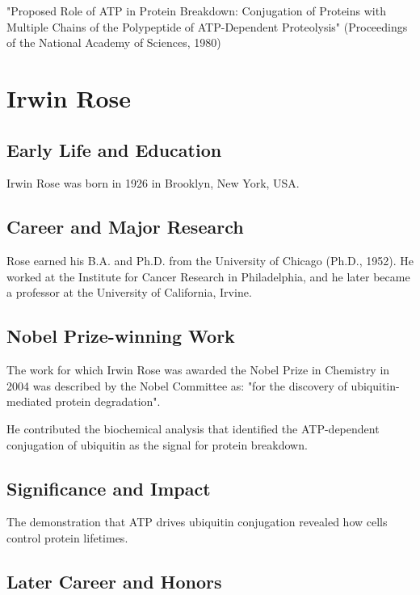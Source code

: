 "Proposed Role of ATP in Protein Breakdown: Conjugation of Proteins with Multiple Chains of the Polypeptide of ATP-Dependent Proteolysis" (Proceedings of the National Academy of Sciences, 1980)

\clearpage

\section{Irwin Rose}

\subsection*{Early Life and Education}

Irwin Rose was born in 1926 in Brooklyn, New York, USA.

\subsection*{Career and Major Research}

Rose earned his B.A. and Ph.D. from the University of Chicago (Ph.D., 1952). He worked at the Institute for Cancer Research in Philadelphia, and he later became a professor at the University of California, Irvine.

\subsection*{Nobel Prize-winning Work}

The work for which Irwin Rose was awarded the Nobel Prize in Chemistry in 2004 was described by the Nobel Committee as: "for the discovery of ubiquitin-mediated protein degradation".

He contributed the biochemical analysis that identified the ATP-dependent conjugation of ubiquitin as the signal for protein breakdown.

\subsection*{Significance and Impact}

The demonstration that ATP drives ubiquitin conjugation revealed how cells control protein lifetimes.

\subsection*{Later Career and Honors}

